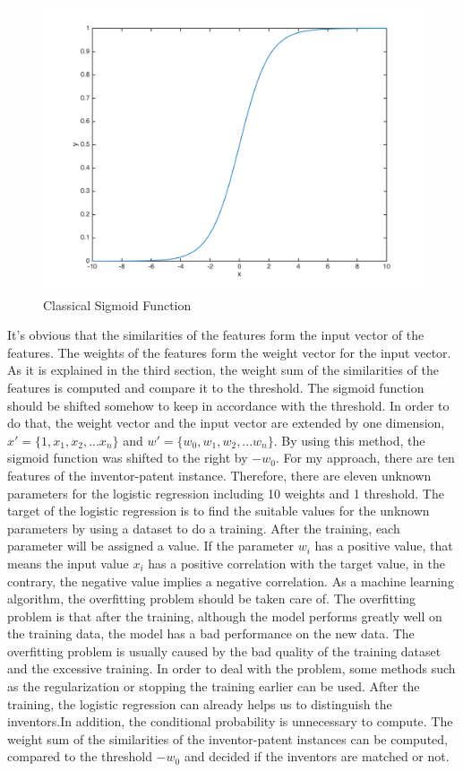 \begin{figure}
\begin{center}
\includegraphics[scale=0.7]{sigmoid.png}
\caption{Classical Sigmoid Function}
\end{center}
\end{figure}


It's obvious that the similarities of the features form the input vector of the features. The weights of the features form the weight vector for the input vector. As it is explained in the third section, the weight sum of the similarities of the features is computed and compare it to the threshold. The sigmoid function should be shifted somehow to keep in accordance with the threshold. In order to do that, the weight vector and the input vector are extended by one dimension, $x'=\{1,x_1,x_2,...x_n\}$ and $w'=\{w_0,w_1,w_2,...w_n\}$. By using this method, the sigmoid function was shifted to the right by $-w_0$. For my approach, there are ten features of  the inventor-patent instance. Therefore, there are eleven unknown parameters for the logistic regression including 10 weights and 1 threshold. The target of the logistic regression is to find the suitable values for the unknown parameters by using a dataset to do a training. After the training, each parameter will be assigned a value. If the parameter $w_i$ has a positive value, that means the input value $x_i$ has a positive correlation with the target value, in the contrary, the negative value implies a negative correlation. As a machine learning algorithm, the overfitting problem should be taken care of. The overfitting problem is that after the training, although the model performs greatly well on the training data, the model has a bad performance on the new data. The overfitting problem is usually caused by the bad quality of the training dataset and the excessive training. In order to deal with the problem, some methods such as the regularization or stopping the training earlier can be used. After the training, the logistic regression can already helps us to distinguish the inventors.In addition, the conditional probability is unnecessary to compute. The weight sum of the similarities of the inventor-patent instances can be computed, compared to the threshold $-w_0$ and decided if the inventors are matched or not.  
 
